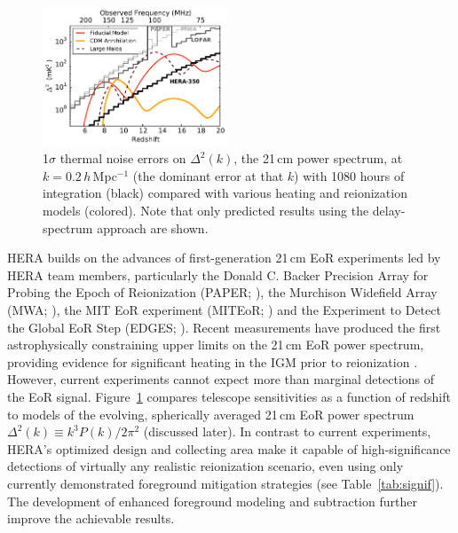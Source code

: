 \documentclass[preprint,11pt]{aastex}
\begin{document}
\begin{figure}[h!]
\centering
    \includegraphics[width=0.49\textwidth,clip]{plots/sensitivity_wideband.pdf}
  \caption{ 1$\sigma$ thermal noise errors on $\Delta^2(k)$, the 21\,cm power spectrum, at $k\!=\!0.2$\,$h$\,Mpc$^{-1}$ (the dominant error at that $k$)
with 1080 hours of integration (black)
compared with various heating and reionization models (colored).  Note that only predicted results using the delay-spectrum approach are shown.}
	\label{fig:Sensitivities}
\end{figure}

HERA builds on the advances of first-generation
21\,cm EoR experiments led by HERA team members, particularly 
the Donald C. Backer Precision Array for Probing the Epoch of Reionization (PAPER; \citealt{parsons_et_al2010}),
the Murchison Widefield Array (MWA; \citealt{bowman_et_al2012,tingay_et_al2013}),
the MIT EoR experiment (MITEoR; \citealt{zheng_et_al2014}) and the Experiment to Detect the Global EoR Step (EDGES; \citealt{bowman_rogers2010}).
Recent measurements
have produced the first astrophysically constraining upper limits on the 21\,cm EoR power spectrum, 
providing evidence for significant heating in the IGM prior to reionization \citep{parsons_etal2014, parsons_et_al2015, ali_et_al2015,pober_et_al2015}.
However, current experiments cannot expect more than marginal detections of the EoR signal. 
Figure~\ref{fig:Sensitivities} compares telescope sensitivities as a function of redshift to models of 
the evolving, spherically averaged 21\,cm EoR power spectrum $\Delta^2 (k) \equiv k^3 P(k) / 2 \pi^2$ (discussed later).  In contrast to current experiments,
HERA's optimized design and collecting area make it capable of
high-significance detections of virtually any realistic reionization scenario, even using only currently demonstrated foreground
mitigation strategies (see Table~\ref{tab:signif}). The development of enhanced foreground modeling and subtraction further improve the achievable results.
\end{document}
